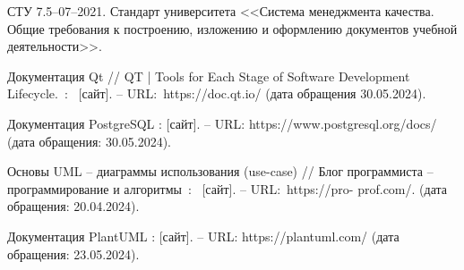 \begin{thebibliography}{0}

    СТУ 7.5–07–2021. 
    Стандарт университета <<Система менеджмента качества. 
    Общие требования к построению, изложению и оформлению 
    документов учебной деятельности>>. 

    Документация Qt 
    // QT | Tools for Each Stage of Software Development Lifecycle.~:~
    [сайт].  – URL:~https://doc.qt.io/ 
    (дата обращения 30.05.2024). 

    Документация PostgreSQL : 
    [сайт]. – URL: https://www.postgresql.org/docs/
    (дата обращения: 30.05.2024).

    Основы UML – диаграммы использования (use-case) 
    // Блог программиста – программирование и алгоритмы~:~
    [сайт]. – URL:~https://pro- prof.com/. 
    (дата обращения: 20.04.2024). 

    Документация PlantUML : 
    [сайт]. – URL: https://plantuml.com/
    (дата обращения: 23.05.2024).

\end{thebibliography}
